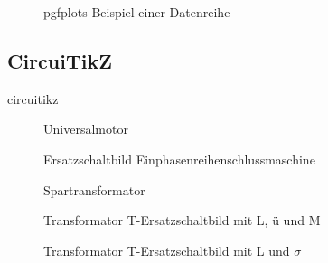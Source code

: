 \begin{figure}[!htbp]
    \centering
    \begin{minipage}[t]{0.95\textwidth}
        \centering
        \caption{\Gls{pgfplots} Beispiel einer Datenreihe}
        \label{fig:pgfplotsexampledata}
    \end{minipage}
\end{figure}

\clearpage

\subsection{CircuiTikZ}\label{subsec:circuitikz}

\Gls{circuitikz}

\begin{figure}[!htbp]
    
    \caption{Universalmotor}
    \label{fig:universalmotor}
\end{figure}

\begin{figure}[!htbp]
    
    \caption{Ersatzschaltbild Einphasenreihenschlussmaschine}
    \label{fig:singlephaseseriesmotor}
\end{figure}

\begin{figure}[!htbp]
    
    \caption{Spartransformator}
    \label{fig:autotransformer}
\end{figure}

\begin{figure}[!htbp]
    
    \caption{Transformator T-Ersatzschaltbild mit L, ü und M}
    \label{fig:transformertequivalent}
\end{figure}

\begin{figure}[!htbp]
    
    \caption{Transformator T-Ersatzschaltbild mit L und $\sigma$}
    \label{fig:transformertequivalent2}
\end{figure}

